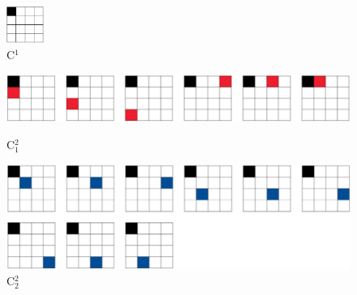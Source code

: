 \documentclass[11pt,dvipsnames]{article} %
\newcommand{\1}{\mathds{1}}
\begin{document}
\begin{figure}[H] %
	\centering
  \includegraphics[height=1.2cm]{C16.png}
	\caption{C${}^{1}$}
	\label{fig:2q-c1}
\end{figure} %

\begin{figure}[H] %
	\begin{minipage}[c]{0.5\textwidth}
		\centering
	  \includegraphics[width=.9\textwidth]{C12.png}
		\vspace{1.2cm}
		\caption{C${}_1^2$}
		\label{fig:equivalence_class_c12}
	\end{minipage}\hfill
	\begin{minipage}[c]{0.5\textwidth}
		\centering
	  \includegraphics[width=.9\textwidth]{C22.png}
		\caption{C${}_2^2$}
		\label{fig:equivalence_class_22}
	\end{minipage}
\end{figure} %
\end{document}
